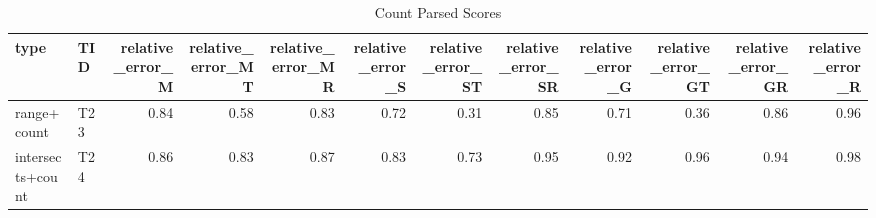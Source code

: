 \begin{table}
\caption{Count Parsed Scores}
\label{tab:count_parsed_scores}
\begin{tabular}{llrrrrrrrrrr}
\hline
type & TID & relative\_error\_M & relative\_error\_MT & relative\_error\_MR & relative\_error\_S & relative\_error\_ST & relative\_error\_SR & relative\_error\_G & relative\_error\_GT & relative\_error\_GR & relative\_error\_R \\
\hline
range+count & T23 & 0.84 & 0.58 & 0.83 & 0.72 & 0.31 & 0.85 & 0.71 & 0.36 & 0.86 & 0.96 \\
intersects+count & T24 & 0.86 & 0.83 & 0.87 & 0.83 & 0.73 & 0.95 & 0.92 & 0.96 & 0.94 & 0.98 \\
\hline
\end{tabular}
\end{table}
